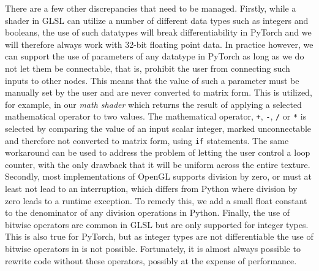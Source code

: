 There are a few other discrepancies that need to be managed. Firstly, while a shader in GLSL can utilize a number of different data types such as integers and booleans, the use of such datatypes will break differentiability in PyTorch and we will therefore always work with 32-bit floating point data. In practice however, we can support the use of parameters of any datatype in PyTorch as long as we do not let them be connectable, that is, prohibit the user from connecting such inputs to other nodes. This means that the value of such a parameter must be manually set by the user and are never converted to matrix form. This is utilized, for example, in our \textit{math shader} which returns the result of applying a selected mathematical operator to two values. The mathematical operator, \texttt{+}, \texttt{-}, \texttt{/} or \texttt{*} is selected by comparing the value of an input scalar integer, marked unconnectable and therefore not converted to matrix form, using \texttt{if} statements. The same workaround can be used to address the problem of letting the user control a loop counter, with the only drawback that it will be uniform across the entire texture. Secondly, most implementations of OpenGL supports division by zero, or must at least not lead to an interruption, which differs from Python where division by zero leads to a runtime exception. To remedy this, we add a small float constant to the denominator of any division operations in Python. Finally, the use of bitwise operators are common in GLSL but are only supported for integer types. This is also true for PyTorch, but as integer types are not differentiable the use of bitwise operators in \dipter{} is not possible. Fortunately, it is almost always possible to rewrite code without these operators, possibly at the expense of performance.



